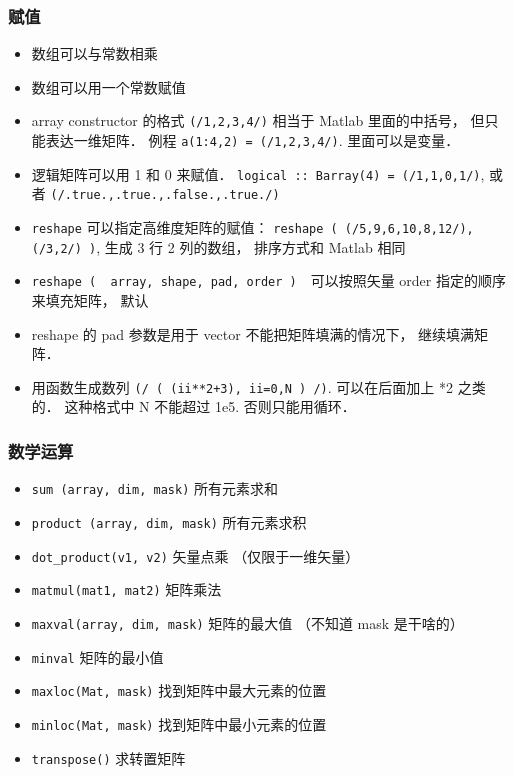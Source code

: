 \subsubsection{赋值}
\begin{itemize}
\item 数组可以与常数相乘
\item 数组可以用一个常数赋值
\item array constructor 的格式 \verb`(/1,2,3,4/)` 相当于 Matlab 里面的中括号， 但只能表达一维矩阵． 例程 \verb`a(1:4,2) = (/1,2,3,4/)`. 里面可以是变量．
\item 逻辑矩阵可以用 1 和 0 来赋值． \verb`logical :: Barray(4) = (/1,1,0,1/)`, 
   或者 \verb`(/.true.,.true.,.false.,.true./)`
\item \verb`reshape` 可以指定高维度矩阵的赋值： 
   \verb`reshape ( (/5,9,6,10,8,12/), (/3,2/) )`, 生成 3 行 2 列的数组， 排序方式和 Matlab 相同
\item \verb`reshape (  array, shape, pad, order )`　可以按照矢量 order 指定的顺序来填充矩阵， 默认
\item reshape 的 pad 参数是用于 vector 不能把矩阵填满的情况下， 继续填满矩阵．
\item 用函数生成数列  \verb`(/ ( (ii**2+3), ii=0,N ) /)`.  可以在后面加上 *2 之类的． 这种格式中 N 不能超过 1e5. 否则只能用循环．
\end{itemize}

\subsubsection{数学运算}
\begin{itemize}
\item \verb`sum (array, dim, mask)` 所有元素求和
\item \verb`product (array, dim, mask)` 所有元素求积
\item \verb`dot_product(v1, v2)` 矢量点乘 （仅限于一维矢量）
\item \verb`matmul(mat1, mat2)` 矩阵乘法
\item \verb`maxval(array, dim, mask)` 矩阵的最大值 （不知道 mask 是干啥的）
\item \verb`minval` 矩阵的最小值
\item \verb`maxloc(Mat, mask)` 找到矩阵中最大元素的位置
\item \verb`minloc(Mat, mask)` 找到矩阵中最小元素的位置
\item \verb`transpose()` 求转置矩阵
\end{itemize}

